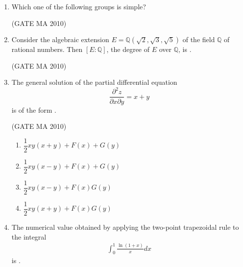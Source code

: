 \documentclass[journal,12pt,onecolumn]{IEEEtran}
\theoremstyle{remark}
\begin{document}
\begin{flushleft}
\begin{enumerate}
\item Which one of the following groups is simple? \underline{\hspace{2cm}}  

\hfill(GATE MA 2010)

\begin{enumerate}
\end{enumerate}

\item Consider the algebraic extension $E=\mathbb{Q}(\sqrt{2},\sqrt{3},\sqrt{5})$ of the field $\mathbb{Q}$ of rational numbers.  
Then $[E:\mathbb{Q}]$, the degree of $E$ over $\mathbb{Q}$, is \underline{\hspace{2cm}}.  

\hfill(GATE MA 2010)

\begin{enumerate}
\end{enumerate}

\item The general solution of the partial differential equation  
\[
\frac{\partial^2 z}{\partial x \partial y} = x+y
\]  
is of the form \underline{\hspace{2cm}}.  

\hfill(GATE MA 2010)

\begin{enumerate}
\item $\dfrac{1}{2}xy(x+y)+F(x)+G(y)$  
\item $\dfrac{1}{2}xy(x-y)+F(x)+G(y)$  
\item $\dfrac{1}{2}xy(x-y)+F(x)G(y)$  
\item $\dfrac{1}{2}xy(x+y)+F(x)G(y)$  
\end{enumerate}

\item The numerical value obtained by applying the two-point trapezoidal rule to the integral  
\begin{align*}
\int_0^1 \frac{\ln(1+x)}{x} dx
\end{align*}
is \underline{\hspace{2cm}}.  


\end{enumerate}
\end{flushleft}
\end{document}
